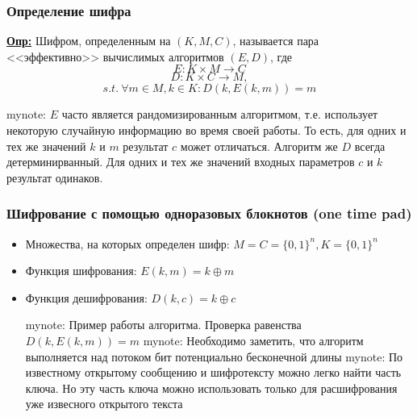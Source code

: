 \documentclass{beamer}
\newcommand{\longdef}[1]{{\textbf{\underline{Опр:}} #1}}
\newcommand{\set}[1]{{\lbrace #1 \rbrace}}
\newcommand{\mynote}[1]{mynote: #1}
\newcommand{\mynote}[1]{}
\begin{document}
\begin{frame}
  \frametitle{Определение шифра}

  \longdef{Шифром, определенным на $(K,M,C)$, называется пара <<эффективно>> вычислимых алгоритмов $(E,D)$, где \newline
    \[E: K \times M \longrightarrow C \]
    \[D: K \times C \longrightarrow M, \]
    \[s.t. ~ \forall m \in M, k \in K: D(k, E(k,m)) = m \]
  }

  \mynote{
  $E$ часто является рандомизированным алгоритмом, т.е. использует
  некоторую случайную информацию во время своей работы. То есть, для одних
  и тех же значений  $k$ и $m$ результат $c$ может отличаться.
  Алгоритм же $D$ всегда детерминирванный. Для одних и тех же значений
  входных параметров $c$ и $k$ результат одинаков.
  }
\end{frame}


\begin{frame}
  \frametitle{Шифрование с помощью одноразовых блокнотов (one time pad)}

  \begin{itemize}
    \itemsep 2em
    \item{Множества, на которых определен шифр: \newline
      $M=C=\set{0,1}^{n}, K=\set{0,1}^{n}$}
    \item{Функция шифрования: \newline
      $E(k,m)=k \oplus m$}
    \item{Функция дешифрования: \newline
      $D(k,c)=k \oplus c$}

    \mynote{Пример работы алгоритма. Проверка равенства $D(k, E(k,m)) = m$}
    \mynote{Необходимо заметить, что алгоритм выполняется над потоком бит потенциально бесконечной длины}
    \mynote{По известному открытому сообщению и шифротексту можно легко найти
    часть ключа. Но эту часть ключа можно использовать только для расшифрования
    уже извесного открытого текста}
  \end{itemize}

\end{frame}
\end{document}
